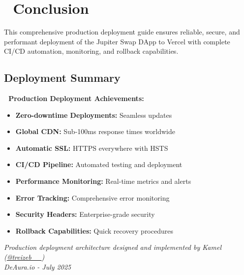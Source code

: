\documentclass[11pt,a4paper]{article}
\begin{document}
\section{🎯 Conclusion}

This comprehensive production deployment guide ensures reliable, secure, and performant deployment of the Jupiter Swap DApp to Vercel with complete CI/CD automation, monitoring, and rollback capabilities.

\subsection{Deployment Summary}

\begin{tcolorbox}[colback=successGreen!10,colframe=successGreen]
\textbf{🚀 Production Deployment Achievements:}
\begin{itemize}
    \item \textbf{Zero-downtime Deployments:} Seamless updates
    \item \textbf{Global CDN:} Sub-100ms response times worldwide
    \item \textbf{Automatic SSL:} HTTPS everywhere with HSTS
    \item \textbf{CI/CD Pipeline:} Automated testing and deployment
    \item \textbf{Performance Monitoring:} Real-time metrics and alerts
    \item \textbf{Error Tracking:} Comprehensive error monitoring
    \item \textbf{Security Headers:} Enterprise-grade security
    \item \textbf{Rollback Capabilities:} Quick recovery procedures
\end{itemize}
\end{tcolorbox}

\vspace{1cm}

\begin{center}
\textit{Production deployment architecture designed and implemented by Kamel (\href{https://x.com/treizeb__}{@treizeb\_\_})\\
DeAura.io - July 2025}
\end{center}
\end{document}
